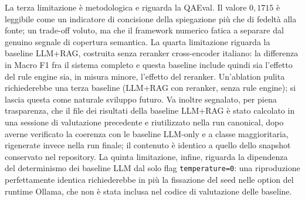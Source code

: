 La terza limitazione è metodologica e riguarda la QAEval. Il valore $0{,}1715$ è leggibile come un indicatore di concisione della spiegazione più che di fedeltà alla fonte; un trade-off voluto, ma che il framework numerico fatica a separare dal genuino segnale di copertura semantica. La quarta limitazione riguarda la baseline LLM+RAG, costruita senza reranker cross-encoder italiano: la differenza in Macro F1 fra il sistema completo e questa baseline include quindi sia l'effetto del rule engine sia, in misura minore, l'effetto del reranker. Un'ablation pulita richiederebbe una terza baseline (LLM+RAG con reranker, senza rule engine); si lascia questa come naturale sviluppo futuro. Va inoltre segnalato, per piena trasparenza, che il file dei risultati della baseline LLM+RAG è stato calcolato in una sessione di valutazione precedente e riutilizzato nella run canonical, dopo averne verificato la coerenza con le baseline LLM-only e a classe maggioritaria, rigenerate invece nella run finale; il contenuto è identico a quello dello snapshot conservato nel repository. La quinta limitazione, infine, riguarda la dipendenza del determinismo dei baseline LLM dal solo flag \texttt{temperature=0}: una riproduzione perfettamente identica richiederebbe in più la fissazione del seed nelle option del runtime Ollama, che non è stata inclusa nel codice di valutazione delle baseline.
